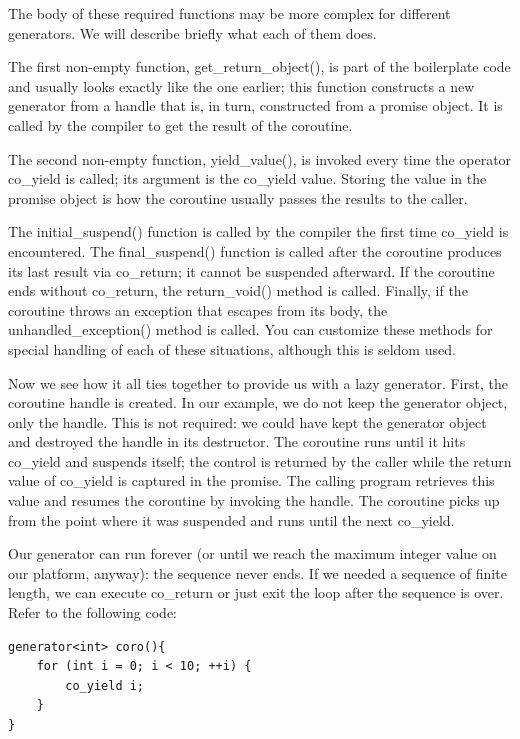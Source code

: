 The body of these required functions may be more complex for different generators. We will describe briefly what each of them does.

The first non-empty function, get\_return\_object(), is part of the boilerplate code and usually looks exactly like the one earlier; this function constructs a new generator from a handle that is, in turn, constructed from a promise object. It is called by the compiler to get the result of the coroutine. 

The second non-empty function, yield\_value(), is invoked every time the operator co\_yield is called; its argument is the co\_yield value. Storing the value in the promise object is how the coroutine usually passes the results to the caller. 

The initial\_suspend() function is called by the compiler the first time co\_yield is encountered. The final\_suspend() function is called after the coroutine produces its last result via co\_return; it cannot be suspended afterward. If the coroutine ends without co\_return, the return\_void() method is called. Finally, if the coroutine throws an exception that escapes from its body, the unhandled\_exception() method is called. You can customize these methods for special handling of each of these situations, although this is seldom used.

Now we see how it all ties together to provide us with a lazy generator. First, the coroutine handle is created. In our example, we do not keep the generator object, only the handle. This is not required: we could have kept the generator object and destroyed the handle in its destructor. The coroutine runs until it hits co\_yield and suspends itself; the control is returned by the caller while the return value of co\_yield is captured in the promise. The calling program retrieves this value and resumes the coroutine by invoking the handle. The coroutine picks up from the point where it was suspended and runs until the next co\_yield. 

Our generator can run forever (or until we reach the maximum integer value on our platform, anyway): the sequence never ends. If we needed a sequence of finite length, we can execute co\_return or just exit the loop after the sequence is over. Refer to the following code:

\begin{lstlisting}[style=styleCXX]
generator<int> coro(){
	for (int i = 0; i < 10; ++i) {
		co_yield i;
	}
}
\end{lstlisting}

